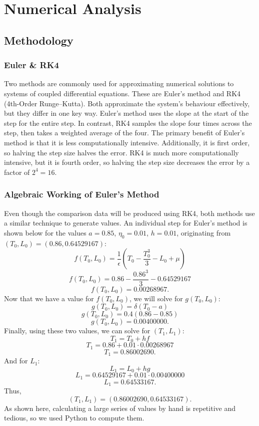 \section{Numerical Analysis}\label{sec:numerical-analysis}
\subsection{Methodology}\label{subsec:methodology}

    \subsubsection{Euler \& RK4}\label{subsubsec:euler-rk4}

    Two methods are commonly used for approximating numerical solutions to systems of coupled differential equations. These are Euler's method and RK4 (4th-Order Runge--Kutta). Both approximate the system's behaviour effectively, but they differ in one key way. Euler's method uses the slope at the start of the step for the entire step. In contrast, RK4 samples the slope four times across the step, then takes a weighted average of the four. The primary benefit of Euler's method is that it is less computationally intensive. Additionally, it is first order, so halving the step size halves the error. RK4 is much more computationally intensive, but it is fourth order, so halving the step size decreases the error by a factor of $2^4=16$.

    \subsubsection{Algebraic Working of Euler's Method}\label{subsubsec:algebraic-working}

    Even though the comparison data will be produced using RK4, both methods use a similar technique to generate values. An individual step for Euler's method is shown below for the values $a=0.85$, $\eta_0=0.01$, $h=0.01$, originating from $\left(T_0,L_0\right)=(0.86,0.64529167)$:
    \[
        f\left(T_0,L_0\right)=\frac{1}{\epsilon}\left(T_0-\frac{T_0^3}{3}-L_0+\mu\right)
    \]
    \[
        f\left(T_0,L_0\right)=0.86-\frac{0.86^3}{3}-0.64529167
    \]
    \[
        f\left(T_0,L_0\right)=0.00268967.
    \]
    Now that we have a value for $f\left(T_0,L_0\right)$, we will solve for $g\left(T_0,L_0\right)$:
    \[
        g\left(T_0,L_0\right)=\delta\left(T_0-a\right)
    \]
    \[
        g\left(T_0,L_0\right)=0.4\left(0.86-0.85\right)
    \]
    \[
        g\left(T_0,L_0\right)=0.00400000.
    \]
    Finally, using these two values, we can solve for $\left(T_1,L_1\right)$:
    \[
        T_1=T_0+hf
    \]
    \[
        T_1=0.86+0.01\cdot0.00268967
    \]
    \[
        T_1=0.86002690.
    \]
    And for $L_1$:
    \[
        L_1=L_0+hg
    \]
    \[
        L_1=0.64529167+0.01\cdot0.00400000
    \]
    \[
        L_1=0.64533167.
    \]
    Thus,
    \[
        \left(T_1,L_1\right)=(0.86002690,0.64533167).
    \]
    As shown here, calculating a large series of values by hand is repetitive and tedious, so we used Python to compute them.


